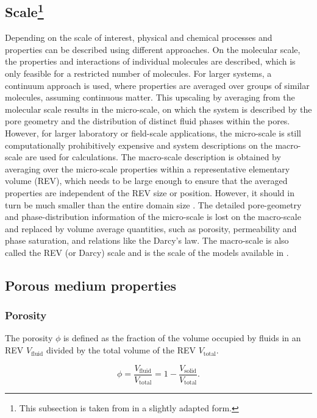\subsection[Scale]{Scale\footnote{\label{foot:hommel}This subsection is taken from \cite{hommel2016modeling} in a slightly adapted form.}} 

Depending on the scale of interest, physical and chemical processes and properties can be described 
using different approaches. 
On the molecular scale, the properties and interactions of individual molecules are described, 
which is only feasible for a restricted number of molecules. 
For larger systems, a continuum approach is used, where properties are averaged over 
groups of similar molecules, assuming continuous matter. This upscaling by averaging 
from the molecular scale results in the micro-scale, on which the system is described by
the pore geometry and the distribution of distinct fluid phases within the pores. 
However, for larger laboratory or field-scale applications, the micro-scale is still 
computationally prohibitively expensive and system descriptions on the macro-scale 
are used for calculations. The macro-scale description is obtained by averaging over the 
micro-scale properties within a representative elementary volume (REV), 
which needs to be large enough to ensure that the averaged properties are independent of the REV size 
or position. However, it should in turn be much smaller than the entire domain size \citep{helmig1997multiphase}. %
The detailed pore-geometry and phase-distribution information of the micro-scale is lost
on the macro-scale and replaced by volume average quantities, 
such as porosity, permeability and phase saturation, 
and relations like the Darcy's law.
The macro-scale is also called the REV (or Darcy) scale and is the scale of the 
models available in \Dumux.

\subsection[Porous medium properties]{Porous medium properties}
\subsubsection{Porosity}
The porosity $\phi$ is defined as the fraction of the volume occupied by fluids in an REV $V_\mathrm{fluid}$ 
divided by the total volume of the REV $V_\mathrm{total}$.

\begin{equation}\label{eq:def_poro}
\phi=\frac{V_\mathrm{fluid}}{V_\mathrm{total}}=1-\frac{V_\mathrm{solid}}{V_\mathrm{total}}.
\end{equation}


